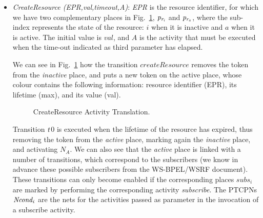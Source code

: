 \begin{itemize}
\item {\it CreateResource (EPR,val,timeout,A)}:
{\em EPR} is the resource identifier, for which we have two complementary places in Fig.~\ref{createresource}, ${\it p_{r_i}}$ and ${\it p_{r_a}}$, where the sub-index represents the state of the resource: $i$ when it is inactive and $a$ when it is active. The initial value is $val$, and $A$ is the activity that must be executed when the time-out indicated as third parameter has elapsed.

We can see in Fig.~\ref{createresource} how the transition $createResource$ removes the token from the {\em inactive} place, and puts a new token on the active place, whose colour contains the following information: resource identifier (EPR), its lifetime (max), and its value (val). %
\begin{figure}[!ht]
\vspace{-0.7cm}
\begin{center}
\end{center}
\vspace{-0.7cm}
\caption{\label{createresource} CreateResource Activity Translation.}
\vspace{-0.5cm}
\end{figure}
Transition ${\it t}$0 is executed when the lifetime of the resource has expired, thus removing the token from the {\em active} place, marking again the {\em inactive} place, and activating $N_A$. We can also see that the {\em active} place is linked with a number of transitions, which correspond to the subscribers (we know in advance these possible subscribers from the WS-BPEL/WSRF document). These transitions can only become enabled if the corresponding places $subs_{i}$ are marked by performing the corresponding  activity {\em subscribe}. The PTCPNs ${\it Ncond_i}$ are the nets for the activities passed as parameter in the invocation of a subscribe activity.   

\end{itemize}
